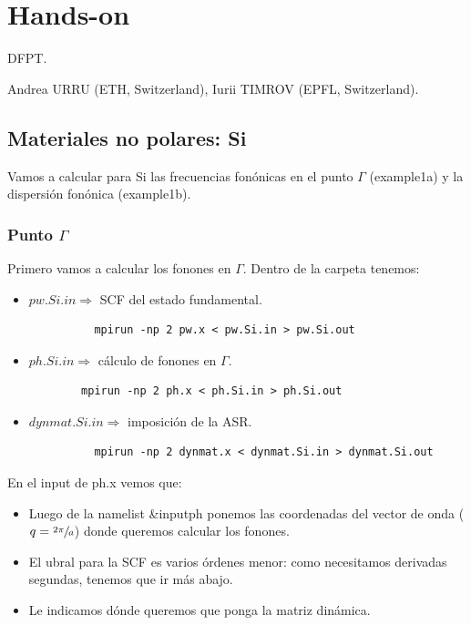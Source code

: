 \section{Hands-on}

   DFPT.

   Andrea URRU (ETH, Switzerland), Iurii TIMROV (EPFL, Switzerland).

\subsection{Materiales no polares: Si}

  Vamos a calcular para Si las frecuencias fonónicas en el punto $\Gamma$ (example1a) y la dispersión fonónica (example1b).

\subsubsection{Punto $\Gamma$}

  Primero vamos a calcular los fonones en $\Gamma$. Dentro de la carpeta tenemos:
    \begin{itemize}
      \item $pw.Si.in \Rightarrow$ SCF del estado fundamental.
        \begin{verbatim}
          mpirun -np 2 pw.x < pw.Si.in > pw.Si.out
        \end{verbatim}
      \item $ph.Si.in \Rightarrow$ cálculo de fonones en $\Gamma$.
      \begin{verbatim}
        mpirun -np 2 ph.x < ph.Si.in > ph.Si.out
      \end{verbatim}
      \item $dynmat.Si.in \Rightarrow$ imposición de la ASR.
      \begin{verbatim}
          mpirun -np 2 dynmat.x < dynmat.Si.in > dynmat.Si.out
      \end{verbatim}
    \end{itemize}

  En el input de ph.x vemos que:
    \begin{itemize}
      \item Luego de la namelist \&inputph ponemos las coordenadas del vector de onda ($q=\sfrac{2\pi}{a}$) donde queremos calcular los fonones.
      \item El ubral para la SCF es varios órdenes menor: como necesitamos derivadas segundas, tenemos que ir más abajo.
      \item Le indicamos dónde queremos que ponga la matriz dinámica.
    \end{itemize}

